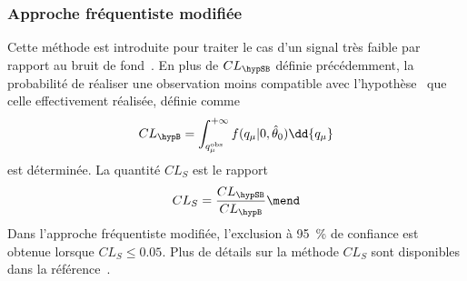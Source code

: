 \subsubsection{Approche fréquentiste modifiée}
Cette méthode est introduite pour traiter le cas d'un signal très faible par rapport au bruit de fond~\cite{Junk:1999kv,CLs_method,Read_2002}.
En plus de $CL_{\hypSB}$ définie précédemment,
la probabilité de réaliser une observation moins compatible avec l'hypothèse \hypB\ que celle effectivement réalisée, définie comme
\begin{equation}
CL_{\hypB} = \int_{q_{\mu}^\text{obs}}^{+\infty} f (q_\mu | 0, \hat{\theta}_0) \dd{q_\mu}
\end{equation}
est déterminée.
La quantité $CL_S$ est le rapport
\begin{equation}
CL_S = \frac{CL_{\hypSB}}{CL_{\hypB}}
\mend
\end{equation}
Dans l'approche fréquentiste modifiée, l'exclusion à \SI{95}{\%} de confiance est obtenue lorsque $CL_S \leq \num{0.05}$.
Plus de détails sur la méthode $CL_S$ sont disponibles dans la référence~\cite{CMS-NOTE-2011-005}.